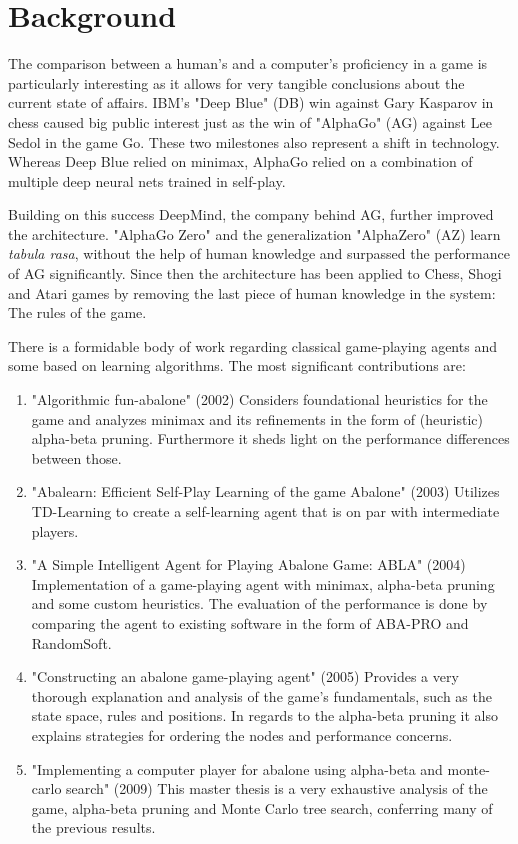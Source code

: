 \documentclass{../lib/llncs}
\begin{document}
\section{Background}
The comparison between a human's and a computer's proficiency in a game is particularly interesting as it allows for very tangible conclusions about the current state of affairs. IBM's "Deep Blue" (DB) win against Gary Kasparov \cite{higgins_brief_2017} in chess caused big public interest just as the win of "AlphaGo" (AG) against Lee Sedol \cite{deepmind_match_nodate} in the game Go. These two milestones also represent a shift in technology. Whereas Deep Blue relied on minimax, AlphaGo relied on a combination of multiple deep neural nets trained in self-play. \cite{silver_mastering_2017}

Building on this success DeepMind, the company behind AG, further improved the architecture. "AlphaGo Zero" and the generalization "AlphaZero" (AZ) learn \textit{tabula rasa}, without the help of human knowledge and surpassed the performance of AG significantly. Since then the architecture has been applied to Chess, Shogi and Atari games by removing the last piece of human knowledge in the system: The rules of the game. \cite{schrittwieser_mastering_2020}

There is a formidable body of work regarding classical game-playing agents and some based on learning algorithms. The most significant contributions are:

\begin{enumerate}
  \item "Algorithmic fun-abalone" (2002) Considers foundational heuristics for the game and analyzes minimax and its refinements in the form of (heuristic) alpha-beta pruning. Furthermore it sheds light on the performance differences between those. \cite{aichholzer_algorithmic_2002}
  \item "Abalearn: Efficient Self-Play Learning of the game Abalone" (2003) Utilizes TD-Learning to create a self-learning agent that is on par with intermediate players. \cite{campos_abalearn_2003}
  \item "A Simple Intelligent Agent for Playing Abalone Game: ABLA" (2004) Implementation of a game-playing agent with minimax, alpha-beta pruning and some custom heuristics. The evaluation of the performance is done by comparing the agent to existing software in the form of ABA-PRO and RandomSoft.\cite{ozcan_simple_2004}
  \item "Constructing an abalone game-playing agent" (2005) Provides a very thorough explanation and analysis of the game's fundamentals, such as the state space, rules and positions. In regards to the alpha-beta pruning it also explains strategies for ordering the nodes and performance concerns. \cite{lemmens_constructing_2005}
  \item "Implementing a computer player for abalone using alpha-beta and monte-carlo search" (2009) This master thesis is a very exhaustive analysis of the game, alpha-beta pruning and Monte Carlo tree search, conferring many of the previous results. \cite{chorus_implementing_2009}
\end{enumerate}
\end{document}
